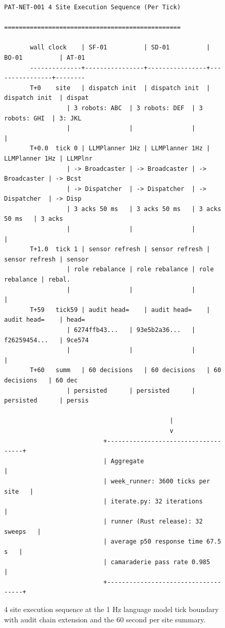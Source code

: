 \begin{sectionaccent}
\begin{figure}[H]
\vspace{-0.15cm}
\centering
\begin{Verbatim}[fontsize=\small]
                     PAT-NET-001 4 Site Execution Sequence (Per Tick)
                     ================================================

       wall clock    | SF-01          | SD-01          | BO-01          | AT-01
       --------------+----------------+----------------+----------------+--------
       T+0    site   | dispatch init  | dispatch init  | dispatch init  | dispat
                 | 3 robots: ABC  | 3 robots: DEF  | 3 robots: GHI  | 3: JKL
                 |                |                |                |
       T+0.0  tick 0 | LLMPlanner 1Hz | LLMPlanner 1Hz | LLMPlanner 1Hz | LLMPlnr
                 | -> Broadcaster | -> Broadcaster | -> Broadcaster | -> Bcst
                 | -> Dispatcher  | -> Dispatcher  | -> Dispatcher  | -> Disp
                 | 3 acks 50 ms   | 3 acks 50 ms   | 3 acks 50 ms   | 3 acks
                 |                |                |                |
       T+1.0  tick 1 | sensor refresh | sensor refresh | sensor refresh | sensor
                 | role rebalance | role rebalance | role rebalance | rebal.
                 |                |                |                |
       T+59   tick59 | audit head=    | audit head=    | audit head=    | head=
                 | 6274ffb43...   | 93e5b2a36...   | f26259454...   | 9ce574
                 |                |                |                |
       T+60   summ   | 60 decisions   | 60 decisions   | 60 decisions   | 60 dec
                 | persisted      | persisted      | persisted      | persis
                            
                                             |
                                             v
                           +------------------------------------+
                           | Aggregate                          |
                           | week_runner: 3600 ticks per site   |
                           | iterate.py: 32 iterations          |
                           | runner (Rust release): 32 sweeps   |
                           | average p50 response time 67.5 s   |
                           | camaraderie pass rate 0.985        |
                           +------------------------------------+
\end{Verbatim}
\caption{4 site execution sequence at the 1 Hz language model tick boundary with audit chain extension and the 60 second per site summary.}
\label{fig:execution-sequence}
\end{figure}


\end{sectionaccent}
